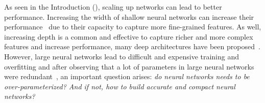







As seen in the Introduction (), scaling up networks can lead to better performance.
Increasing the width of shallow neural networks can increase their performance~\cite{howard2017mobilenets,sandler2018mobilenetv2,tan2019mnasnet,zagoruyko2016wide} due to their capacity to capture more fine-grained features.
As well, increasing depth is a common and effective to capture richer and more complex features and increase performance, many deep architectures have been proposed~\cite{he2016deep,huang2016deep, szegedy2016rethinking,szegedy2017inception,xiao2018dynamical}.
However, large neural networks lead to difficult and expensive training and overfitting and after observing that a lot of parameters in large neural networks were redundant~\cite{dai2018compressing,frankle2018lottery}, an important question arises: \emph{do neural networks needs to be over-parameterized? And if not, how to build accurate and compact neural networks?} 

